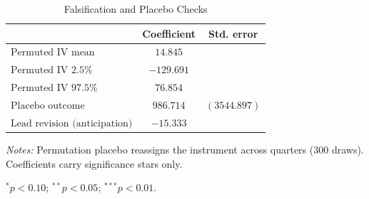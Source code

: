 \begin{table}[htbp]
\centering
\begin{threeparttable}
\caption{Falsification and Placebo Checks}
\label{tab:placebo_tests}
{\small
\begin{tabular}{lcc}
\toprule
 & Coefficient & Std. error \\
\midrule
$\text{Permuted IV mean}$ & $14.845$ &  \\
$\text{Permuted IV }2.5\%$ & $-129.691$ &  \\
$\text{Permuted IV }97.5\%$ & $76.854$ &  \\
\addlinespace
$\text{Placebo outcome}$ & $986.714$ & $(3544.897)$ \\
$\text{Lead revision (anticipation)}$ & $-15.333$ &  \\
\bottomrule
\end{tabular}
}
\begin{tablenotes}[flushleft]
\footnotesize
\item \textit{Notes:} Permutation placebo reassigns the instrument across quarters (300 draws). Coefficients carry significance stars only.
\item $^{*}p<0.10$; $^{**}p<0.05$; $^{***}p<0.01$.
\end{tablenotes}
\end{threeparttable}
\end{table}
